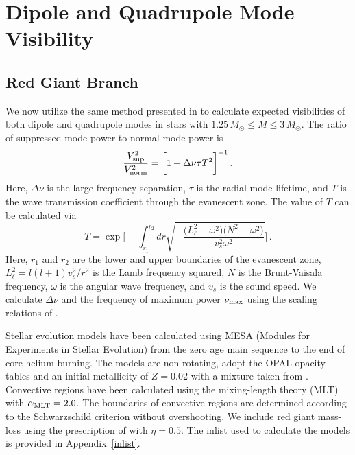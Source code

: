 \section{Dipole and Quadrupole Mode Visibility}\label{visibility}


\subsection{Red Giant Branch}
\label{rgb}


We now utilize the same method presented in \citet{Fuller_2015} to calculate expected visibilities of both dipole and quadrupole modes in stars with $1.25 \, M_\odot \leq M \leq 3 \, M_\odot$. The ratio of suppressed mode power to normal mode power is
\begin{equation}
\label{eqn:vsup}
\frac{V_{\rm sup}^2}{V_{\rm norm}^2} = \bigg[ 1 + \Delta \nu \tau T^2 \bigg]^{-1} \, .
\end{equation}
Here, $\Delta \nu$ is the large frequency separation, $\tau$ is the radial mode lifetime, and $T$ is the wave transmission coefficient through the evanescent zone. The value of $T$ can be calculated via
\begin{equation}
\label{eqn:T}
T  = \exp \bigg[ - \int^{r_2}_{r_1} dr \sqrt{ - \frac{ \big( L_\ell^2 - \omega^2 \big) \big(N^2 - \omega^2 \big) }{v_s^2 \omega^2} } \bigg] \, .
\end{equation}
Here, $r_1$ and $r_2$ are the lower and upper boundaries of the evanescent zone, $L_\ell^2 = l(l+1)v_s^2/r^2$ is the Lamb frequency squared, $N$ is the Brunt-Vaisala frequency, $\omega$ is the angular wave frequency, and $v_s$ is the sound speed. We calculate $\Delta \nu$ and the frequency of maximum power $\nu_{\rm max}$ using the scaling relations of \cite{Huber_2011}.

Stellar evolution models have been calculated using MESA (Modules for Experiments in Stellar Evolution) \citep[MESA,release 7456][]{Paxton_2010,Paxton_2013,Paxton_2015} from the zero age main sequence to the end of core helium burning. The models are non-rotating, adopt the OPAL opacity tables \citep{Iglesias:96} and an initial metallicity of $Z=0.02$ with a mixture taken from \citet{Asplund:2005}.  
Convective regions have been calculated using the mixing-length theory (MLT) with $\alpha_{\rm MLT}=2.0$. The boundaries of convective regions are determined according to the Schwarzschild criterion without overshooting. We include red giant mass-loss using the prescription of \citet{Reimers:1975} with $\eta=0.5$. The inlist used to calculate the models is provided in Appendix~\ref{inlist}.
  
